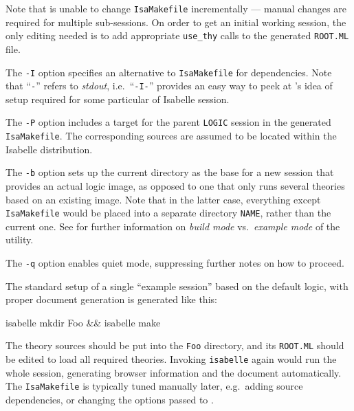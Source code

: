 \begin{isabellebody}
\begin{isamarkuptext}
  Note that \hyperlink{tool.mkdir}{\mbox{}} is unable to change \verb|IsaMakefile|
  incrementally --- manual changes are required for multiple
  sub-sessions.  On order to get an initial working session, the only
  editing needed is to add appropriate \verb|use_thy| calls to the
  generated \verb|ROOT.ML| file.%
\end{isamarkuptext}%
\isamarkuptrue%
%
\isamarkuptrue%
%
\begin{isamarkuptext}%
The \verb|-I| option specifies an alternative to \verb|IsaMakefile| for dependencies.  Note that ``\verb|-|'' refers
  to \emph{stdout}, i.e.\ ``\verb|-I-|'' provides an easy way
  to peek at \hyperlink{tool.mkdir}{\mbox{}}'s idea of \hyperlink{tool.make}{\mbox{}} setup required for
  some particular of Isabelle session.

  \medskip The \verb|-P| option includes a target for the
  parent \verb|LOGIC| session in the generated \verb|IsaMakefile|.  The corresponding sources are assumed to be located
  within the Isabelle distribution.

  \medskip The \verb|-b| option sets up the current directory
  as the base for a new session that provides an actual logic image,
  as opposed to one that only runs several theories based on an
  existing image.  Note that in the latter case, everything except
  \verb|IsaMakefile| would be placed into a separate directory
  \verb|NAME|, rather than the current one.  See
   for further information on \emph{build
  mode} vs.\ \emph{example mode} of the \hyperlink{tool.usedir}{\mbox{}} utility.

  \medskip The \verb|-q| option enables quiet mode, suppressing
  further notes on how to proceed.%
\end{isamarkuptext}%
\isamarkuptrue%
%
\isamarkuptrue%
%
\begin{isamarkuptext}%
The standard setup of a single ``example session'' based on the
  default logic, with proper document generation is generated like
  this:
\begin{ttbox}
isabelle mkdir Foo && isabelle make
\end{ttbox}

  \noindent The theory sources should be put into the \verb|Foo|
  directory, and its \verb|ROOT.ML| should be edited to load all
  required theories.  Invoking \verb|isabelle| \hyperlink{tool.make}{\mbox{}} again
  would run the whole session, generating browser information and the
  document automatically.  The \verb|IsaMakefile| is typically
  tuned manually later, e.g.\ adding source dependencies, or changing
  the options passed to \hyperlink{tool.usedir}{\mbox{}}.


\end{isamarkuptext}
\end{isabellebody}

